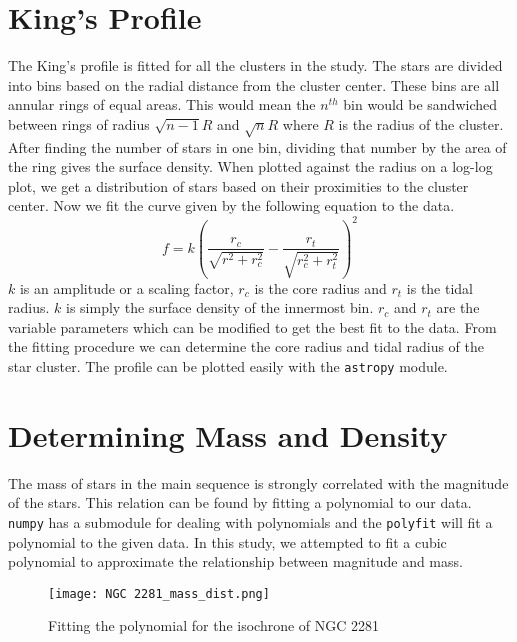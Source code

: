 \section{King's Profile}
The King's profile\citep{kingprofile} is fitted for all the clusters in the study. The stars are divided into bins based on the radial distance from the cluster center. These bins are all annular rings of equal areas. This would mean the $n^{th}$ bin would be sandwiched between rings of radius $\sqrt{n-1}R$ and $\sqrt{n}R$ where $R$ is the radius of the cluster. After finding the number of stars in one bin, dividing that number by the area of the ring gives the surface density. When plotted against the radius on a log-log plot, we get a distribution of stars based on their proximities to the cluster center. Now we fit the curve given by the following equation to the data.
$$f = k \left( \frac{r_c}{\sqrt{r^2+r_c^2}} - \frac{r_t}{\sqrt{r_c^2+r_t^2}} \right) ^2$$
$k$ is an amplitude or a scaling factor, $r_c$ is the core radius and $r_t$ is the tidal radius. $k$ is simply the surface density of the innermost bin. $r_c$ and $r_t$ are the variable parameters which can be modified to get the best fit to the data. From the fitting procedure we can determine the core radius and tidal radius of the star cluster. The profile can be plotted easily with the \lstinline{astropy}\citep{astropy} module.

\section{Determining Mass and Density}
The mass of stars in the main sequence is strongly correlated with the magnitude of the stars. This relation can be found by fitting a polynomial to our data. \lstinline{numpy} {} has a submodule for dealing with polynomials and the \lstinline{polyfit} {}will fit a polynomial to the given data. In this study, we attempted to fit a cubic polynomial to approximate the relationship between magnitude and mass. 

\begin{figure}[h]
	\centering
	\texttt{[image: NGC 2281\_mass\_dist.png]}
	\caption{Fitting the polynomial for the isochrone of NGC 2281}
	\label{fig:image_n}
\end{figure}



